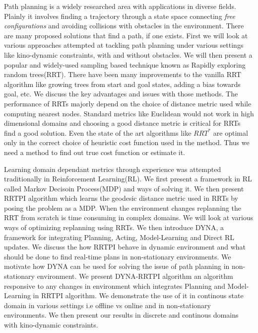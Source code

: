 \documentclass[MTech]{iitmdiss}
\begin{document}
\abstract
Path planning is a widely researched area with applications in diverse fields.  Plainly it involves finding a trajectory through a state space connecting \textit{free configurations} and avoiding collisions with obstacles in the environment. There are many proposed solutions that find a path, if one exists. First we will look at various approaches attempted at tackling path planning under various settings like kino-dynamic constraints, with and without obstacles. We will then present a popular and widely-used sampling based technique known as Rapidly exploring random trees(RRT). There have been many improvements to the vanilla RRT algorithm like growing trees from start and goal states, adding a bias towards goal, etc. We discuss the key advantages and issues with those methods. The performance of RRTs majorly depend on the choice of  distance metric used while computing nearest nodes. Standard metrics like Euclidean would not work in high dimensional domains and choosing a good distance metric is critical for RRTs find a good solution. Even the state of the art algorithms like $RRT^*$ are optimal only in the correct choice of heuristic cost function used in the method. Thus we need a method to find out true cost function or estimate it.

Learning domain dependant metrics through experience was attempted traditionally in Reinforcement Learning(RL). We first present a framework in RL called Markov Decisoin Process(MDP) and ways of solving it. We then present RRTPI algorithm which learns the geodesic distance metric used in RRTs by posing the problem as a MDP. When the environment changes replanning the RRT from scratch is time consuming in complex domains. We will look at various ways of optimizing replanning using RRTs.
We then introduce DYNA, a framework for integrating Planning, Acting, Model-Learning and Direct RL updates. We discuss the how RRTPI behave in dynamic environment and what should be done to find real-time plans in non-stationary environments.
We motivate how DYNA  can be used for solving the issue of path planning in non-stationary environment. We present DYNA-RRTPI algorithm an algorithm responsive to any changes in environment which integrates Planning and Model-Learning in RRTPI algorithm. We demonstrate the use of it in continous state domain in various settings i.e offline vs online and in non-stationary environments. We then present our results in discrete and  continous domains with kino-dynamic constraints.

\pagebreak
\end{document}
